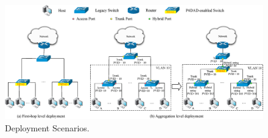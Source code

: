 \documentclass[a4paper,fleqn]{cas-dc}
\begin{document}

            \begin{figure}
                \centerline{
                    \includegraphics[scale=0.48]{figure/Deployment.eps}
                }
                \vspace{-0.2cm}
                \caption{Deployment Scenarios.}
                \label{fig:deployment}
                \vspace{-0.3cm}
            \end{figure}

            
\end{document}
